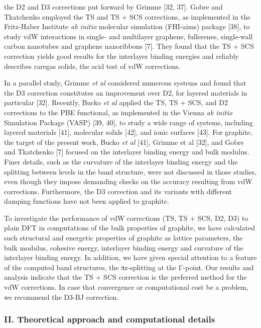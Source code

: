 \documentclass{article}
\begin{document}
the D2 and D3 corrections put forward by Grimme [32, 37]. Gobre and Tkatchenko employed the TS and TS + SCS corrections, as implemented in the Fritz-Haber Institute \textit{ab initio} molecular simulation (FHI-aims) package [38], to study vdW interactions in single- and multilayer graphene, fullerenes, single-wall carbon nanotubes and graphene nanoribbons [7]. They found that the TS + SCS correction yields good results for the interlayer binding energies and reliably describes raregas solids, the acid test of vdW corrections.

In a parallel study, Grimme \textit{et al} considered numerous systems and found that the D3 correction constitutes an improvement over D2, for layered materials in particular [32]. Recently, Bucko \textit{et al} applied the TS, TS + SCS, and D2 corrections to the PBE functional, as implemented in the Vienna \textit{ab initio} Simulation Package (VASP) [39, 40], to study a wide range of systems, including layered materials [41], molecular solids [42], and ionic surfaces [43]. For graphite, the target of the present work, Bucko \textit{et al} [41], Grimme et al [32], and Gobre and Tkatchenko [7] focused on the interlayer binding energy and bulk modulus. Finer details, such as the curvature of the interlayer binding energy and the splitting between levels in the band structure, were not discussed in those studies, even though they impose demanding checks on the accuracy resulting from vdW corrections. Furthermore, the D3 correction and its variants with different damping functions have not been applied to graphite.

To investigate the performance of vdW corrections (TS, TS + SCS, D2, D3) to plain DFT in computations of the bulk properties of graphite, we have calculated such structural and energetic properties of graphite as lattice parameters, the bulk modulus, cohesive energy, interlayer binding energy and curvature of the interlayer binding energy. In addition, we have given special attention to a feature of the computed band structures, the πz-splitting at the Γ-point. Our results and analysis indicate that the TS + SCS correction is the preferred method for the vdW corrections. In case that convergence or computational cost be a problem, we recommend the D3-BJ correction.

\subsubsection{II. \textbf{Theoretical approach and computational details}}
\end{document}
